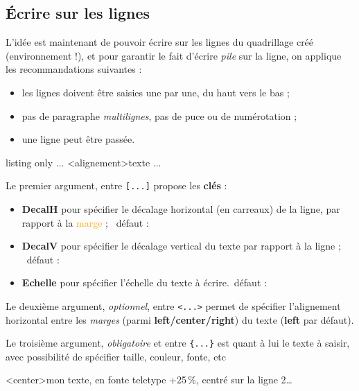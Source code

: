 \documentclass[a4paper]{article}
\newcommand\Cle[1]{{\bfseries\sffamily\textlangle #1\textrangle}}
\begin{document}
\subsection{Écrire sur les lignes}

L'idée est maintenant de pouvoir écrire sur les lignes du quadrillage créé (environnement !), et pour garantir le fait d'écrire \textit{pile} sur la ligne, on applique les recommandations suivantes :

\begin{itemize}
	\item les lignes doivent être saisies une par une, du \og haut \fg{} vers le \og bas \fg{} ;
	\item pas de paragraphe \textit{multilignes}, pas de puce ou de numérotation ;
	\item une ligne peut être passée.
\end{itemize}

\begin{PresentationCode}{listing only}
...
	\EcrireLigneGurvan[clés]<alignement>{texte}
	\PasseLigneGurvan
...
\end{PresentationCode}

Le premier argument, entre \texttt{[...]} propose les \Cle{clés} :

\begin{itemize}
	\item \Cle{DecalH} pour spécifier le décalage horizontal (en carreaux) de la ligne, par rapport à la \textcolor{orange}{marge} ; \hfill~défaut : \Cle{0}
	\item \Cle{DecalV} pour spécifier le décalage vertical du texte par rapport à la ligne ; \hfill~défaut : \Cle{0pt}
	\item \Cle{Echelle} pour spécifier l'échelle du texte à écrire.\hfill~défaut : \Cle{1}
\end{itemize}

Le deuxième argument, \textit{optionnel}, entre \texttt{<...>} permet de spécifier l'alignement horizontal entre les \textit{marges} (parmi \Cle{left/center/right}) du texte (\Cle{left} par défaut).

\medskip

Le troisième argument, \textit{obligatoire} et entre \texttt{\{...\}} est quant à lui le texte à saisir, avec possibilité de spécifier taille, couleur, fonte, etc

\begin{PresentationCode}{}
\begin{EnvGurvan}[Marge=1,Interligne=2,NbCarreaux=17x4]
	\EcrireLigneGurvan[Echelle=1.25]<center>{\ttfamily mon texte, en fonte teletype +25\,\%, centré sur la ligne 2\ldots}
\end{EnvGurvan}
\end{PresentationCode}
\pagebreak
\end{document}
